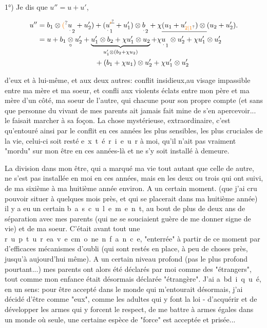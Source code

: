 1°) Je dis que $u''=u+u'$, 

\[
\begin{aligned}
u''&=b_1\otimes\unsure{(}\underset{\cdot}{u}_2+u'_2)+(\underset{\cdot}{u}_1^{\deleted{\unsure{\prime}}}+u'_1)\otimes \underset{\cdot}{b}_2+\chi\underline{(u_1+u_{\unsure{2|1}}')\otimes{}}(u_2+u'_2).\\
&=u+b_1\underset{\circ}{\otimes} u'_2+
\underbrace{u'_1\otimes b_2+\chi u'_1\otimes u_2}_{u'_1\otimes(b_2+\chi u_2)}
+\chi\underset{\cdot}{u}_1\otimes u'_2+\chi u'_1\otimes u'_2\\
&\hspace{8em}+(b_1+\chi u_1)\otimes u'_2+\chi u'_1\otimes u'_2
\end{aligned}
\]



d'eux et à lui-même, et aux deux autres: conflit insidieux,au visage impassible entre ma mère et ma soeur, et confli aux violents éclats entre mon père et ma mère d'un côté, ma soeur de l'autre, qui chacune pour son propre compte (et sans que personne du vivant de mes parents ait jamais fait mine de s'en apercevoir... le faisait marcher à sa foçon. La chose mystérieuse, extraordinaire, c'est qu'entouré ainsi par le conflit en ces années les plus sensibles, les plus cruciales de la vie, celui-ci soit resté \mbox{e x t é r i e u r} à moi, qu'il n'ait pas vraiment "mordu" sur mon être en ces années-là et ne s'y soit installé à demeure.

La division dans mon être, qui a marqué ma vie tout autant que celle de  autre, ne s'est pas installée en moi en ces années, mais en les deux ou trois  qui ont suivi, de ma sixième à ma huitième année environ. A un certain moment. (que j'ai cru pouvoir situer à quelques mois près, et qui se placerait dans ma huitième année) il y a eu un certain \mbox{b a s c u l e m e n t}, au bout de plus de deux ans de séparation avec mes parents (qui ne se souciaient guère de me donner signe de vie) et de ma soeur. C'était avant tout une \mbox{r u p t u r e}\quad\mbox{a v e c}\quad\mbox{m o n}\quad\mbox{e n f a n c e}, "enterrée" à partir de ce moment par d'efficaces mécanismes d'oubli (qui sont restés en place, à peu de choses près, jusqu'à aujourd'hui même). A un certain niveau profond (pas le plus profond pourtant...) mes parents ont alors été déclarés par moi comme des "étrangers", tout comme mon enfance était désormais déclarée "étrangère". J'ai \mbox{a bd i q u é}, en un sens: pour être accepté dans le monde qui m'entourait désormais, j'ai décidé d'être comme "eux", comme les adultes qui y font la loi - d'acquérir et de développer les armes qui y forcent le respect, de me battre à armes égales dans un monde où seule, une certaine espèce de "force" est acceptée et prisée...

